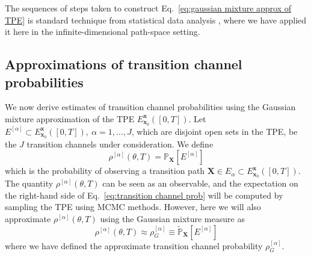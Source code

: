 The sequences of steps taken to construct Eq.~\ref{eq:gaussian mixture approx of TPE} is standard technique from statistical data analysis \citep{gelmanBayesianDataAnalysis, scottMultivariateDensityEstimation2015, goodfellowDeepLearning2016, nguyenApproximationFiniteMixtures2020, carreira-perpinanModefindingMixturesGaussian2000}, where we have applied it here in the infinite-dimensional path-space setting.

\subsection{Approximations of transition channel probabilities} \label{sec:Approximations of transition channel probabilities}

We now derive estimates of transition channel probabilities using the Gaussian mixture approximation of the TPE $E_{\mathbf{x}_0}^{\mathbf{x}}([0,T])$. Let $E^{[\alpha]} \subset E_{\mathbf{x}_0}^{\mathbf{x}}([0,T]),\ \alpha=1,\dots,J$,
which are disjoint open sets in the TPE, be the $J$ transition channels
under consideration. We define
\begin{equation} \label{eq:transition channel prob}
	\rho^{[\alpha]}(\theta,T)=\mathbb{P}_\mathbf{X}[E^{[\alpha]}]
\end{equation}
which is the probability of observing a transition path $\mathbf{X} \in E_{\alpha} \subset E_{\mathbf{x}_0}^{\mathbf{x}}([0,T])$. The quantity $\rho^{[\alpha]}(\theta,T)$ can be seen as an observable, and the expectation on the right-hand side of Eq.~\ref{eq:transition channel prob} will be computed by sampling the TPE using MCMC methods. However, here we will also approximate $\rho^{[\alpha]}(\theta,T)$ using the Gaussian mixture measure as
\begin{equation} \label{eq:transition channel prob approx}
	\rho^{[\alpha]}(\theta,T) \approx \rho_G^{[\alpha]} \equiv \tilde{\mathbb{P}}_\mathbf{X}[E^{[\alpha]}]
\end{equation}
where we have defined the approximate transition channel probability $\rho_G^{[\alpha]}$.

